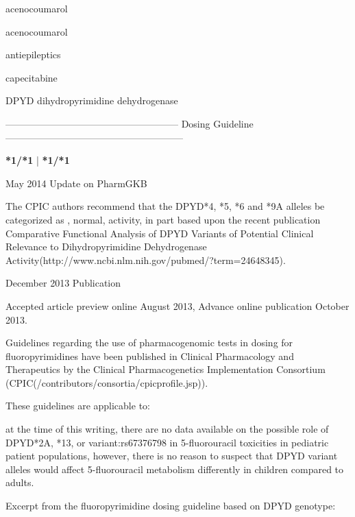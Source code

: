 \documentclass{resume} %
\begin{document}
\begin{rSection}{ acenocoumarol }
\begin{rSection}{ acenocoumarol }
\begin{rSection}{ antiepileptics }
\end{rSection}
\begin{rSection}{ capecitabine }
\item[]
\begin{rSubsection}{ DPYD }{ dihydropyrimidine dehydrogenase }{}{}
\item[]
\item[] ------------------------------------------------------ Dosing Guideline --------------------------------------------------------\newline
\item[]
\item[] \textbf{ *1/*1 } | \textbf{ *1/*1 }
\item May 2014 Update on PharmGKB
 \newline
\item The CPIC authors recommend that the DPYD*4, *5, *6 and *9A alleles be categorized as , normal,  activity, in part based upon the recent publication Comparative Functional Analysis of DPYD Variants of Potential Clinical Relevance to Dihydropyrimidine Dehydrogenase Activity(http://www.ncbi.nlm.nih.gov/pubmed/?term=24648345). 
 \newline
\item December 2013 Publication
 \newline
\item Accepted article preview online August 2013,  Advance online publication October 2013.
 \newline
\item Guidelines regarding the use of pharmacogenomic tests in dosing for fluoropyrimidines have been published in Clinical Pharmacology and Therapeutics by the Clinical Pharmacogenetics Implementation Consortium (CPIC(/contributors/consortia/cpicprofile.jsp)).
 \newline
\item These guidelines are applicable to:
 \newline
\item at the time of this writing, there are no data available on the possible role of DPYD*2A, *13, or variant:rs67376798 in 5-fluorouracil toxicities in pediatric patient populations,  however, there is no reason to suspect that DPYD variant alleles would affect 5-fluorouracil metabolism differently in children compared to adults.
 \newline
\item Excerpt from the fluoropyrimidine dosing guideline based on DPYD genotype:
 \newline

\end{rSubsection}
\end{rSection}
\end{rSection}
\end{rSection}
\end{document}
